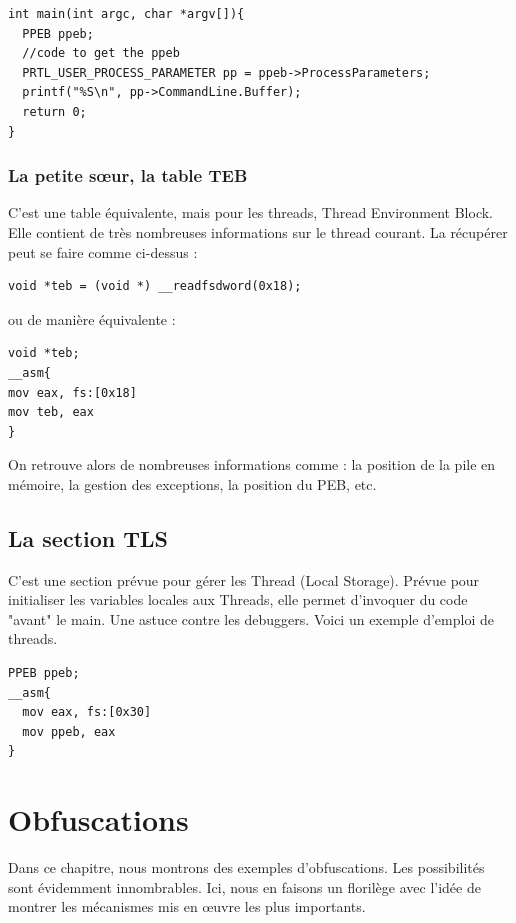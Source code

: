 \documentclass{book}
\begin{document}
\begin{verbatim}
int main(int argc, char *argv[]){
  PPEB ppeb;
  //code to get the ppeb
  PRTL_USER_PROCESS_PARAMETER pp = ppeb->ProcessParameters;
  printf("%S\n", pp->CommandLine.Buffer);   
  return 0;
}
\end{verbatim}


\subsection{La petite s\oe ur, la table TEB}

C'est une table équivalente, mais pour les threads, Thread Environment Block. Elle contient de très nombreuses informations sur le thread courant. La récupérer peut se faire comme ci-dessus :

\begin{verbatim}
void *teb = (void *) __readfsdword(0x18);
\end{verbatim}

ou de manière équivalente : 

\begin{verbatim}
void *teb;
__asm{
mov eax, fs:[0x18]
mov teb, eax
}
\end{verbatim}


On retrouve alors de nombreuses informations comme : la position de la pile en mémoire, la gestion des exceptions, la position du PEB, etc. 


\section{La section TLS}

C'est une section prévue pour gérer les Thread (Local Storage). Prévue pour initialiser les variables locales aux Threads, elle permet d'invoquer du code "avant" le main. Une astuce contre les debuggers. Voici un exemple d'emploi de threads. 

\begin{verbatim}
PPEB ppeb;
__asm{
  mov eax, fs:[0x30]
  mov ppeb, eax
}
\end{verbatim}




\chapter{Obfuscations}

Dans ce chapitre, nous montrons des exemples d'obfuscations. Les possibilités sont évidemment innombrables. Ici, nous en faisons un florilège avec l'idée de montrer les mécanismes mis en \oe uvre les plus importants. 
\end{document}
